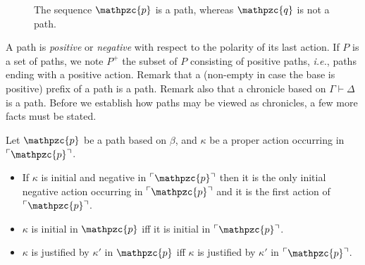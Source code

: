 \documentclass{LMCS}
\def\ie{{\em i.e.}}
\newcommand{\design}[1]{{\mathfrak{#1}}}
\newcommand{\pathLL}[1]{\mathpzc{#1}}\newcommand{\strategy}[1]{\pathLL{#1}}\newcommand{\view}[1]{\raisebox{.3ex}{$\ulcorner$}{#1}\raisebox{.3ex}{$\urcorner$}}\newcommand{\fullview}[1]{\raisebox{.3ex}{$\ulcorner\mkern-6mu\ulcorner\mkern-2mu$}{#1}\raisebox{.3ex}{$\mkern-2mu\urcorner\mkern-6mu\urcorner$}}\newcommand{\views}[1]{\view{#1}}\newcommand{\fullviews}[1]{\fullview{#1}}\newcommand{\shuffle}[1]{\llcorner\design{#1}\lrcorner}\newcommand{\PoD}[1]{{\mathcal{P}}_{#1}}\newcommand{\norm}[1]{\llbracket\design{#1}\rrbracket}
\begin{document}
\begin{figure}
\begin{center}
\begin{minipage}{.40\textwidth}
{
}
\end{minipage}
\end{center}
\caption{The sequence $\pathLL{p}$ is a path, whereas $\pathLL{q}$ is not a path.}
\label{fig:ExNegJump}
\end{figure}






 

A path is {\em positive} or {\em negative} with respect to the polarity of its last action. If $P$ is a set of paths, we note $P^+$ the subset of $P$ consisting of positive paths, \ie, paths ending with a positive action.
Remark that a (non-empty in case the base is positive) prefix of a path is a path.
Remark also that a chronicle based on $\Gamma \vdash \Delta$ is a path.
Before we establish how paths may be viewed as chronicles, a few more facts must be stated.

 \begin{lem}\label{projection}
Let $\pathLL{p}$ be a path based on $\beta$, and $\kappa$ be a proper action occurring in $\view{\pathLL{p}}$. 
  \begin{itemize}
  \item If $\kappa$ is initial and negative in $\view{\pathLL{p}}$ then it is the only initial negative action occurring in $\view{\pathLL{p}}$ and it is the first action of $\view{\pathLL{p}}$.
  \item $\kappa$ is initial in $\pathLL{p}$  iff it is  initial in $\view{\pathLL{p}}$.
  \item $\kappa$ is justified by $\kappa'$ in $\pathLL{p}$ iff  $\kappa$ is justified by $\kappa'$ in $\view{\pathLL{p}}$.
  \end{itemize}
 \end{lem}
\end{document}
